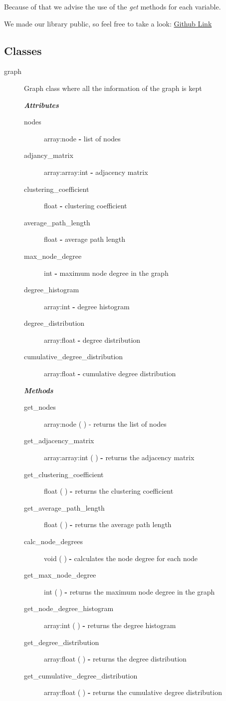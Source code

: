 \documentclass[a4paper,titlepage,11pt]{article}
\begin{document}
Because of that we advise the use of the \textit{get} methods for each variable.

We made our library public, so feel free to take a look:
\href{https://github.com/j-godinho/rc-project}{Github Link}

\subsection*{Classes}
\begin{description}
\item [graph] Graph class where all the information of the graph is kept

\textit{ \textbf{Attributes} }
\begin{description}
\item [ nodes ] array:node \textbf{-} list of nodes
\item [ adjancy\_matrix ] array:array:int \textbf{-} adjacency matrix
\item [ clustering\_coefficient ] float \textbf{-} clustering coefficient
\item [ average\_path\_length ] float \textbf{-} average path length
\item [ max\_node\_degree ] int \textbf{-} maximum node degree in the graph
\item [ degree\_histogram ] array:int \textbf{-} degree histogram
\item [ degree\_distribution ] array:float \textbf{-} degree distribution
\item [ cumulative\_degree\_distribution ] array:float \textbf{-} cumulative degree distribution
\end{description}

\textit{ \textbf{Methods} }
\begin{description}
\item [get\_nodes] array:node ( ) - returns the list of nodes
\item [get\_adjacency\_matrix] array:array:int ( ) \textbf{-} returns the adjacency matrix
\item [get\_clustering\_coefficient] float ( ) \textbf{-} returns the clustering coefficient
\item [get\_average\_path\_length] float ( ) \textbf{-} returns the average path length
\item [calc\_node\_degrees] void ( ) \textbf{-} calculates the node degree for each node
\item [get\_max\_node\_degree] int ( ) \textbf{-} returns the maximum node degree in the graph
\item [get\_node\_degree\_histogram] array:int ( ) \textbf{-} returns the degree histogram
\item [get\_degree\_distribution] array:float ( ) \textbf{-} returns the degree distribution
\item [get\_cumulative\_degree\_distribution] array:float ( ) \textbf{-} returns the cumulative degree distribution
\end{description}


\end{description}
\end{document}
